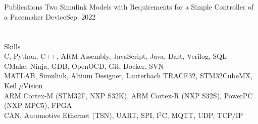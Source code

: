 \section{}{Publications\hspace{463pt}}
\resumeEntryStart
    \resumeEntryTD
      {Two Simulink Models with Requirements for a Simple Controller of a Pacemaker Device}{Sep. 2022}
      \resumeItemListStart
      \resumeItemListEnd
      \resumeEntryEnd
\section{}{Skills\hspace{500pt}}
\resumeEntryStart
   {\\C, Python, C++, ARM Assembly, JavaScript, Java, Dart, Verilog, SQL}
   {\\CMake, Ninja, GDB, OpenOCD, Git, Docker, SVN}
   {\\MATLAB, Simulink, Altium Designer, Lauterbach TRACE32, STM32CubeMX, Keil $\mu$Vision}
   {\\ARM Cortex-M (STM32F, NXP S32K), ARM Cortex-R (NXP S32S), PowerPC (NXP MPC5), FPGA}
   {\\CAN, Automotive Ethernet (TSN), UART, SPI, I$^2$C, MQTT, UDP, TCP/IP}
\resumeEntryEnd
